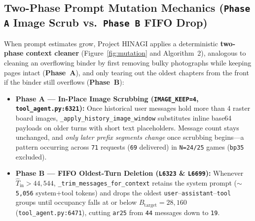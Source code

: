 \documentclass[10pt]{article}
\newcommand{\code}[1]{\texttt{#1}}
\begin{document}
\subsection{Two-Phase Prompt Mutation Mechanics (\code{Phase A} Image Scrub vs.\ \code{Phase B} FIFO Drop)}
When prompt estimates grow, Project HINAGI applies a deterministic \textbf{two-phase context cleaner} (Figure~\ref{fig:mutation} and Algorithm~2), analogous to cleaning an overflowing binder by first removing bulky photographs while keeping pages intact (\textbf{Phase~A}), and only tearing out the oldest chapters from the front if the binder still overflows (\textbf{Phase~B}):
\begin{itemize}[leftmargin=1.4em,itemsep=2pt]
\item \textbf{Phase A --- In-Place Image Scrubbing (\code{IMAGE\_KEEP=4}, \code{tool\_agent.py:6321}):} Once historical user messages hold more than 4 raster board images, \code{\_apply\_history\_image\_window} substitutes inline base64 payloads on older turns with short text placeholders. Message count stays unchanged, and \emph{only later prefix segments change} once scrubbing begins---a pattern occurring across \code{71} requests (\code{69} delivered) in \code{N=24/25} games (\code{bp35} excluded).
\item \textbf{Phase B --- FIFO Oldest-Turn Deletion (\code{L6323} \& \code{L6699}):} Whenever $\hat{T}_{\text{in}} > 44,544$, \code{\_trim\_\allowbreak messages\_\allowbreak for\_context} retains the system prompt (\code{$\sim$5,056} system+tool tokens) and drops the oldest \code{user}--\code{assistant}--\code{tool} groups until occupancy falls at or below $B_{\text{target}} = 28,160$ (\code{tool\_agent.py:6471}), cutting \code{ar25} from \code{44} messages down to \code{19}.
\end{itemize}
\end{document}
